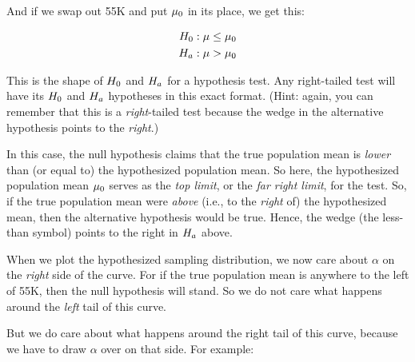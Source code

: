 \documentclass[../../../main.tex]{subfiles}
\begin{document}
\noindent
And if we swap out 55K and put $\HypPopMean/$ in its place, we get this:

\begin{align*}
  \NullHyp/: \populationmean \leq \HypPopMean/ \\
  \AltHyp/: \populationmean > \HypPopMean/
\end{align*}

\noindent
This is the shape of $\NullHyp/$ and $\AltHyp/$ for a  hypothesis test. Any right-tailed test will have its $\NullHyp/$ and $\AltHyp/$ hypotheses in this exact format. (Hint: again, you can remember that this is a \emph{right}-tailed test because the wedge in the alternative hypothesis points to the \emph{right}.)

In this case, the null hypothesis claims that the true population mean is \emph{lower} than (or equal to) the hypothesized population mean. So here, the hypothesized population mean $\HypPopMean/$ serves as the \emph{top limit}, or the \emph{far right limit}, for the test. So, if the true population mean were \emph{above} (i.e., to the \emph{right} of) the hypothesized mean, then the alternative hypothesis would be true. Hence, the wedge (the less-than symbol) points to the right in $\AltHyp/$ above.

When we plot the hypothesized sampling distribution, we now care about $\alpha$ on the \emph{right} side of the curve. For if the true population mean is anywhere to the left of 55K, then the null hypothesis will stand. So we do not care what happens around the \emph{left} tail of this curve.

But we do care about what happens around the right tail of this curve, because we have to draw $\alpha$ over on that side. For example:

\begin{center}
\end{center}
\end{document}
